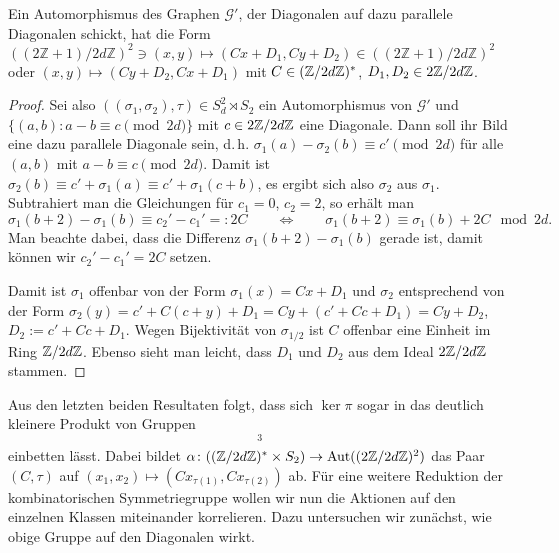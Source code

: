 \begin{lemma}
Ein Automorphismus des Graphen $\mathcal G'$, der Diagonalen auf dazu parallele Diagonalen schickt, hat die Form $((2\mathbb Z+1)/2d\mathbb Z)^2 \ni (x,y) \mapsto (Cx+D_1, Cy+D_2) \in ((2\mathbb Z+1)/2d\mathbb Z)^2$ oder $(x,y) \mapsto (Cy+D_2, Cx+D_1)$ mit $C \in (\Zmod 2dZ)^*$, $D_1, D_2 \in 2\Zmod 2dZ$.
\end{lemma}
\begin{proof}
Sei also $((\sigma_1, \sigma_2), \tau) \in S_d^2 \rtimes S_2$ ein Automorphismus von $\mathcal G'$ und $\{(a,b) : a-b \equiv c \pmod{2d}\}$ mit $c \in 2\Zmod 2dZ$ eine Diagonale. Dann soll ihr Bild eine dazu parallele Diagonale sein, d.\,h. $\sigma_1(a) - \sigma_2(b) \equiv c' \pmod{2d}$ für alle $(a,b)$ mit $a-b \equiv c \pmod{2d}$. Damit ist $\sigma_2(b) \equiv c' + \sigma_1(a) \equiv c' + \sigma_1(c+b)$, es ergibt sich also $\sigma_2$ aus $\sigma_1$. Subtrahiert man die Gleichungen für $c_1=0$, $c_2=2$, so erhält man
\begin{equation*}
\sigma_1(b+2) - \sigma_1(b) \equiv c_2' - c_1' =: 2C \qquad\Longleftrightarrow\qquad \sigma_1(b+2) \equiv \sigma_1(b) + 2C  \mod{2d}.
\end{equation*}
Man beachte dabei, dass die Differenz $\sigma_1(b+2) - \sigma_1(b)$ gerade ist, damit können wir $c_2' - c_1' = 2C$ setzen.

Damit ist $\sigma_1$ offenbar von der Form $\sigma_1(x) = Cx+D_1$ und $\sigma_2$ entsprechend von der Form $\sigma_2(y) = c' + C(c+y) + D_1 = Cy + (c'+Cc+D_1) = Cy + D_2$, $D_2 := c'+Cc+D_1$. Wegen Bijektivität von $\sigma_{1/2}$ ist $C$ offenbar eine Einheit im Ring $\Zmod 2dZ$. Ebenso sieht man leicht, dass $D_1$ und $D_2$ aus dem Ideal $2\Zmod 2dZ$ stammen.
\end{proof}

Aus den letzten beiden Resultaten folgt, dass sich $\ker \pi$ sogar in das deutlich kleinere Produkt von Gruppen
\begin{equation*}
[(2\Zmod 2dZ)^2 \rtimes_\alpha ((\Zmod 2dZ)^* \times S_2)]^3
\end{equation*}
einbetten lässt. Dabei bildet $\alpha \colon ((\Zmod 2dZ)^* \times S_2) \to \Aut ((2\Zmod 2dZ)^2)$ das Paar $(C,\tau)$ auf $(x_1,x_2) \mapsto (Cx_{\tau(1)},Cx_{\tau(2)})$ ab. Für eine weitere Reduktion der kombinatorischen Symmetriegruppe wollen wir nun die Aktionen auf den einzelnen Klassen miteinander korrelieren. Dazu untersuchen wir zunächst, wie obige Gruppe auf den Diagonalen wirkt.

